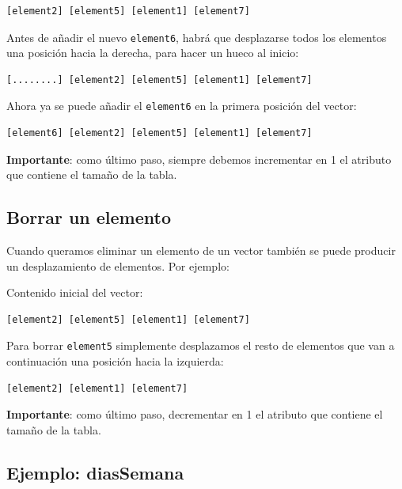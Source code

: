 \documentclass[
]{book}
\begin{document}
\begin{verbatim}
[element2] [element5] [element1] [element7]
\end{verbatim}

Antes de añadir el nuevo \texttt{element6}, habrá que desplazarse todos los elementos una posición hacia la derecha, para hacer un hueco al inicio:

\begin{verbatim}
[........] [element2] [element5] [element1] [element7]
\end{verbatim}

Ahora ya se puede añadir el \texttt{element6} en la primera posición del vector:

\begin{verbatim}
[element6] [element2] [element5] [element1] [element7]
\end{verbatim}

\textbf{Importante}: como último paso, siempre debemos incrementar en 1 el atributo que contiene el tamaño de la tabla.

\hypertarget{borrar-un-elemento}{%
\subsection{Borrar un elemento}\label{borrar-un-elemento}}

Cuando queramos eliminar un elemento de un vector también se puede producir un desplazamiento de elementos. Por ejemplo:

Contenido inicial del vector:

\begin{verbatim}
[element2] [element5] [element1] [element7]
\end{verbatim}

Para borrar \texttt{element5} simplemente desplazamos el resto de elementos que van a continuación una posición hacia la izquierda:

\begin{verbatim}
[element2] [element1] [element7]
\end{verbatim}

\textbf{Importante}: como último paso, decrementar en 1 el atributo que contiene el tamaño de la tabla.

\hypertarget{ejemplo-diassemana}{%
\subsection{Ejemplo: diasSemana}\label{ejemplo-diassemana}}
\end{document}
